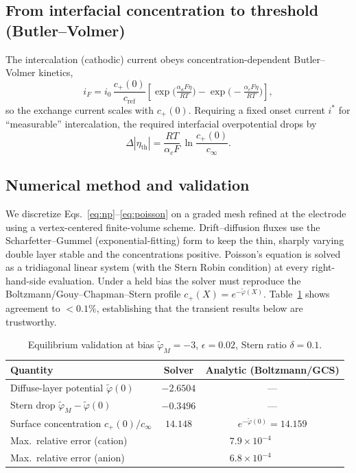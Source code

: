 \documentclass[11pt,a4paper]{article}
\newcommand{\cinf}{\ensuremath{c_{\infty}}}
\newcommand{\cs}{\ensuremath{c_{+}(0)}}
\begin{document}
\subsection{From interfacial concentration to threshold (Butler--Volmer)}
The intercalation (cathodic) current obeys concentration-dependent
Butler--Volmer kinetics,
\begin{equation}
i_F = i_0\,\frac{\cs}{c_{\mathrm{ref}}}
      \left[\exp\!\Big(\tfrac{\alpha_a F\eta}{RT}\Big)
          - \exp\!\Big(\!-\tfrac{\alpha_c F\eta}{RT}\Big)\right],
\label{eq:bv}
\end{equation}
so the exchange current scales with $\cs$. Requiring a fixed onset current $i^*$
for ``measurable'' intercalation, the required interfacial overpotential drops by
\begin{equation}
\Delta|\eta_{\mathrm{th}}| = \frac{RT}{\alpha_c F}\,\ln\!\frac{\cs}{\cinf}.
\label{eq:threshold}
\end{equation}

\subsection{Numerical method and validation}
We discretize Eqs.~\eqref{eq:np}--\eqref{eq:poisson} on a graded mesh refined at
the electrode using a vertex-centered finite-volume scheme. Drift--diffusion
fluxes use the Scharfetter--Gummel (exponential-fitting) form to keep the thin,
sharply varying double layer stable and the concentrations positive. Poisson's
equation is solved as a tridiagonal linear system (with the Stern Robin
condition) at every right-hand-side evaluation. Under a held bias the solver
must reproduce the Boltzmann/Gouy--Chapman--Stern profile $c_+(X)=e^{-\tilde
\varphi(X)}$. Table~\ref{tab:val} shows agreement to $<0.1\%$, establishing that
the transient results below are trustworthy.

\begin{table}[H]
\centering
\caption{Equilibrium validation at bias $\tilde\varphi_M=-3$, $\epsilon=0.02$, Stern ratio $\delta=0.1$.}
\label{tab:val}
\begin{tabular}{lcc}
\toprule
Quantity & Solver & Analytic (Boltzmann/GCS)\\
\midrule
Diffuse-layer potential $\tilde\varphi(0)$ & $-2.6504$ & --- \\
Stern drop $\tilde\varphi_M-\tilde\varphi(0)$ & $-0.3496$ & --- \\
Surface concentration $c_+(0)/\cinf$ & $14.148$ & $e^{-\tilde\varphi(0)}=14.159$ \\
Max.\ relative error (cation) & \multicolumn{2}{c}{$7.9\times10^{-4}$} \\
Max.\ relative error (anion)  & \multicolumn{2}{c}{$6.8\times10^{-4}$} \\
\bottomrule
\end{tabular}
\end{table}
\end{document}
